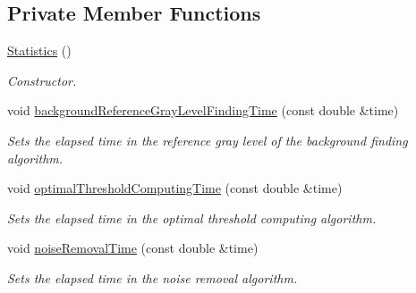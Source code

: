 \subsection*{Private Member Functions}
\begin{CompactItemize}
\item 
\hyperlink{class_statistics_60ddd90a571ed4c3ce8c0f6317a36d63}{Statistics} ()
\begin{CompactList}\small\item\em Constructor. \item\end{CompactList}\item 
void \hyperlink{class_statistics_f8a60e8a89be8fe8b2c46782681c1a2c}{backgroundReferenceGrayLevelFindingTime} (const double \&time)
\begin{CompactList}\small\item\em Sets the elapsed time in the reference gray level of the background finding algorithm. \item\end{CompactList}\item 
void \hyperlink{class_statistics_eed35a930f29f4596f3715306e1e1dbc}{optimalThresholdComputingTime} (const double \&time)
\begin{CompactList}\small\item\em Sets the elapsed time in the optimal threshold computing algorithm. \item\end{CompactList}\item 
void \hyperlink{class_statistics_4ad24aec4e5491b7d3afca143e6deb05}{noiseRemovalTime} (const double \&time)
\begin{CompactList}\small\item\em Sets the elapsed time in the noise removal algorithm. \item\end{CompactList}\end{CompactItemize}
